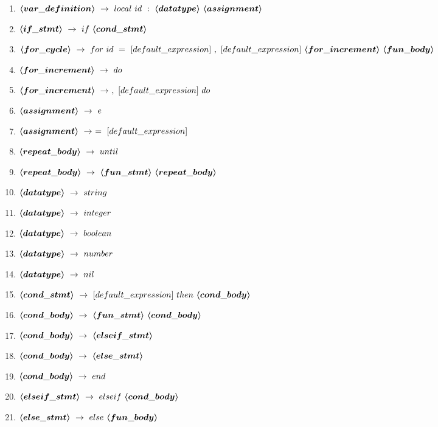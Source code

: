 \begin{enumerate}
	\item $\mbox{\boldmath$\langle{}var\_definition\rangle{}$}\ \rightarrow\ local\ id\ :\ \mbox{\boldmath$\langle{}datatype\rangle{}$}\ \mbox{\boldmath$\langle{}assignment\rangle{}$}$
	\item $\mbox{\boldmath$\langle{}if\_stmt\rangle{}$}\ \rightarrow\ if\ \mbox{\boldmath$\langle{}cond\_stmt\rangle{}$}$
	\item $\mbox{\boldmath$\langle{}for\_cycle\rangle{}$}\ \rightarrow\ for\ id\ =\ [default\_expression]\ ,\ [default\_expression]\ \mbox{\boldmath$\langle{}for\_increment\rangle{}$}\ \mbox{\boldmath$\langle{}fun\_body\rangle{}$}$
	\item $\mbox{\boldmath$\langle{}for\_increment\rangle{}$}\ \rightarrow\ do$
	\item $\mbox{\boldmath$\langle{}for\_increment\rangle{}$}\ \rightarrow\ ,\ [default\_expression]\ do$
	\item $\mbox{\boldmath$\langle{}assignment\rangle{}$}\ \rightarrow\ e$
	\item $\mbox{\boldmath$\langle{}assignment\rangle{}$}\ \rightarrow\ =\ [default\_expression]$
	\item $\mbox{\boldmath$\langle{}repeat\_body\rangle{}$}\ \rightarrow\ until$
	\item $\mbox{\boldmath$\langle{}repeat\_body\rangle{}$}\ \rightarrow\ \mbox{\boldmath$\langle{}fun\_stmt\rangle{}$}\ \mbox{\boldmath$\langle{}repeat\_body\rangle{}$}$
	\item $\mbox{\boldmath$\langle{}datatype\rangle{}$}\ \rightarrow\ string$
	\item $\mbox{\boldmath$\langle{}datatype\rangle{}$}\ \rightarrow\ integer$
	\item $\mbox{\boldmath$\langle{}datatype\rangle{}$}\ \rightarrow\ boolean$
	\item $\mbox{\boldmath$\langle{}datatype\rangle{}$}\ \rightarrow\ number$
	\item $\mbox{\boldmath$\langle{}datatype\rangle{}$}\ \rightarrow\ nil$
	\item $\mbox{\boldmath$\langle{}cond\_stmt\rangle{}$}\ \rightarrow\ [default\_expression]\ then\ \mbox{\boldmath$\langle{}cond\_body\rangle{}$}$
	\item $\mbox{\boldmath$\langle{}cond\_body\rangle{}$}\ \rightarrow\ \mbox{\boldmath$\langle{}fun\_stmt\rangle{}$}\ \mbox{\boldmath$\langle{}cond\_body\rangle{}$}$
	\item $\mbox{\boldmath$\langle{}cond\_body\rangle{}$}\ \rightarrow\ \mbox{\boldmath$\langle{}elseif\_stmt\rangle{}$}$
	\item $\mbox{\boldmath$\langle{}cond\_body\rangle{}$}\ \rightarrow\ \mbox{\boldmath$\langle{}else\_stmt\rangle{}$}$
	\item $\mbox{\boldmath$\langle{}cond\_body\rangle{}$}\ \rightarrow\ end$
	\item $\mbox{\boldmath$\langle{}elseif\_stmt\rangle{}$}\ \rightarrow\ elseif\ \mbox{\boldmath$\langle{}cond\_body\rangle{}$}$
	\item $\mbox{\boldmath$\langle{}else\_stmt\rangle{}$}\ \rightarrow\ else\ \mbox{\boldmath$\langle{}fun\_body\rangle{}$}$
\end{enumerate}



